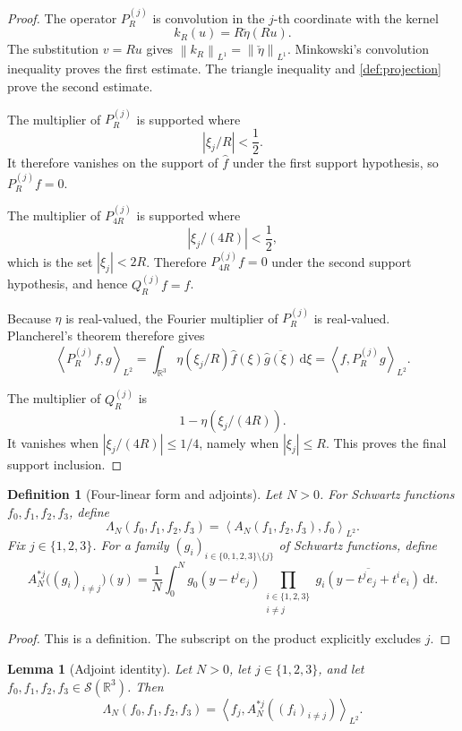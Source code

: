 \documentclass[11pt]{article}
\newtheorem{lemma}[theorem]{Lemma}
\newtheorem{definition}[theorem]{Definition}
\newcommand{\R}{\mathbb{R}}
\newcommand{\Sch}{\mathcal{S}}
\newcommand{\dd}{\,\mathrm{d}}
\newcommand{\ip}[2]{\left\langle #1,#2\right\rangle}
\newcommand{\norm}[2]{\left\lVert #1\right\rVert_{#2}}
\newcommand{\abs}[1]{\left|#1\right|}
\newcommand{\indices}{\{1,2,3\}}
\begin{document}
	\begin{proof}
		The operator \(P_R^{(j)}\) is convolution in the \(j\)-th coordinate with the kernel
		\[
		k_R(u)=R\check\eta(Ru).
		\]
		The substitution \(v=Ru\) gives \(\norm{k_R}{L^1}=\norm{\check\eta}{L^1}\).  Minkowski's convolution inequality proves the first estimate.  The triangle inequality and \cref{def:projection} prove the second estimate.
		
		The multiplier of \(P_R^{(j)}\) is supported where
		\[
		\abs{\xi_j/R}<\frac12.
		\]
		It therefore vanishes on the support of \(\widehat f\) under the first support hypothesis, so \(P_R^{(j)}f=0\).
		
		The multiplier of \(P_{4R}^{(j)}\) is supported where
		\[
		\abs{\xi_j/(4R)}<\frac12,
		\]
		which is the set \(\abs{\xi_j}<2R\).  Therefore \(P_{4R}^{(j)}f=0\) under the second support hypothesis, and hence \(Q_R^{(j)}f=f\).
		
		Because \(\eta\) is real-valued, the Fourier multiplier of \(P_R^{(j)}\) is real-valued.  Plancherel's theorem therefore gives
		\[
		\ip{P_R^{(j)}f}{g}_{L^2}
		=
		\int_{\R^3}\eta(\xi_j/R)\widehat f(\xi)\overline{\widehat g(\xi)}\dd\xi
		=
		\ip{f}{P_R^{(j)}g}_{L^2}.
		\]
		
		The multiplier of \(Q_R^{(j)}\) is
		\[
		1-\eta(\xi_j/(4R)).
		\]
		It vanishes when \(\abs{\xi_j/(4R)}\leq1/4\), namely when \(\abs{\xi_j}\leq R\).  This proves the final support inclusion.
	\end{proof}
	
	\begin{definition}[Four-linear form and adjoints]\label{def:adjoint}
		Let \(N>0\).  For Schwartz functions \(f_0,f_1,f_2,f_3\), define
		\[
		\Lambda_N(f_0,f_1,f_2,f_3)=\ip{A_N(f_1,f_2,f_3)}{f_0}_{L^2}.
		\]
		Fix \(j\in\indices\).  For a family \((g_i)_{i\in\{0,1,2,3\}\setminus\{j\}}\) of Schwartz functions, define
		\[
		A_N^{*j}\bigl((g_i)_{i\neq j}\bigr)(y)
		=
		\frac1N\int_0^N g_0(y-t^j e_j)
		\prod_{\substack{i\in\indices\\i\neq j}}
		\overline{g_i(y-t^j e_j+t^i e_i)}\dd t.
		\]
	\end{definition}
	
	\begin{proof}
		This is a definition.  The subscript on the product explicitly excludes \(j\).
	\end{proof}
	
	\begin{lemma}[Adjoint identity]\label{lem:adjoint-identity}
		Let \(N>0\), let \(j\in\indices\), and let \(f_0,f_1,f_2,f_3\in\Sch(\R^3)\).  Then
		\[
		\Lambda_N(f_0,f_1,f_2,f_3)
		=
		\ip{f_j}{A_N^{*j}((f_i)_{i\neq j})}_{L^2}.
		\]
	\end{lemma}
	
\end{document}
